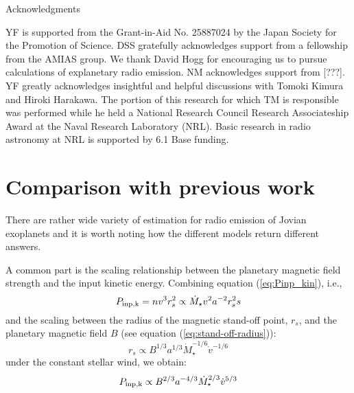 \documentclass[iop,numberedappendix,apj]{emulateapj}
\begin{document}


\vspace{0.5in}

\acknowledgements

{\sc Acknowledgments}

YF is supported from the Grant-in-Aid No. 25887024 by the Japan Society for the Promotion of Science.
DSS gratefully acknowledges support from a fellowship from the AMIAS group.
We thank David Hogg for encouraging us to pursue calculations of explanetary radio emission.
NM acknowledges support from [???]. 
YF greatly acknowledges insightful and helpful discussions with Tomoki Kimura and Hiroki Harakawa. 
The portion of this research for which TM is responsible was performed while he held a National Research Council Research Associateship Award at the Naval Research Laboratory (NRL).
Basic research in radio astronomy at NRL is supported by 6.1 Base funding.




\newpage

\appendix

\section{Comparison with previous work}


There are rather wide variety of estimation for radio emission of Jovian exoplanets and it is worth noting how the different models return different answers. 

A common part is the scaling relationship between the planetary magnetic field strength and the input kinetic energy.
Combining equation (\ref{eq:Pinp_kin}), i.e.,
\begin{equation}
P_{\rm inp,k}=nv^3 r_s^2 \propto \dot M_{\star} v^2 a^{-2} r_s^2 s
\end{equation}
and the scaling between the radius of the magnetic stand-off point, $r_s$, and the planetary magnetic field $B$ (see equation (\ref{eq:stand-off-radius})):
\begin{equation}
r_s \propto B^{1/3} a^{1/3} \dot M_{\star }^{-1/6} \dot v^{-1/6}
\end{equation}
under the constant stellar wind, we obtain:
\begin{equation}
P_{\rm inp, k} \propto B^{2/3} a^{-4/3} \dot M_{\star }^{2/3} \dot v^{5/3}
\end{equation}
\end{document}
